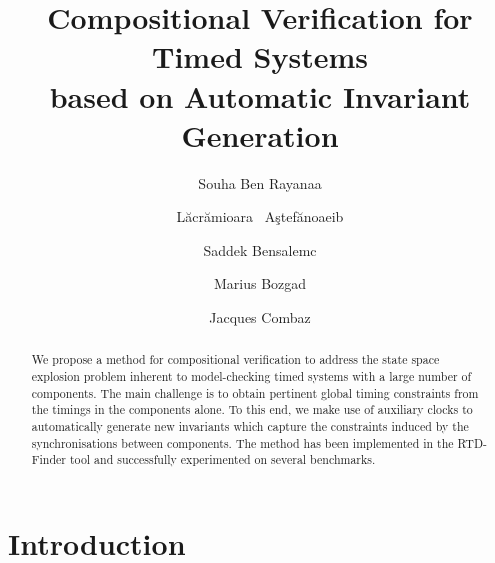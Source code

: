 \documentclass{LMCS}
\theoremstyle{plain}\newtheorem{remark}[thm]{Remark}
\theoremstyle{plain}\newtheorem{example}[thm]{Example}
\begin{document}
\title[Compositional Verification for Timed Systems]
{Compositional Verification for Timed Systems\\ based on Automatic Invariant Generation\rsuper*}

\author[S.~Ben Rayana]{Souha Ben Rayana\rsuper a}
\address{{}Univ. Grenoble Alpes, VERIMAG, F-38000 Grenoble}

\author[L.~A\c stef\u anoaei]{L\u acr\u amioara ~A\c stef\u
  anoaei\rsuper b}
\address{\vspace{-18 pt}}


\author[S.~Bensalem]{Saddek Bensalem\rsuper c}
\address{\vspace{-18 pt}}


\author[M.~Bozga]{Marius Bozga\rsuper d}
\address{{}CNRS, VERIMAG, F-38000 Grenoble, France}

\author[J.~Combaz]{Jacques Combaz}
\address{\vspace{-18 pt}}




\begin{abstract}
  We propose a method for compositional verification to address the
  state space explosion problem inherent to model-checking timed
  systems with a large number of components. The main challenge is to
  obtain pertinent global timing constraints from the timings in the
  components alone. To this end, we make use of auxiliary clocks to
  automatically generate new invariants which capture the constraints
  induced by the synchronisations between components. The method has
  been implemented in the RTD-Finder tool and  successfully experimented on several benchmarks.
\end{abstract}

\maketitle

\section{Introduction}
\label{sec:intro}
\end{document}
